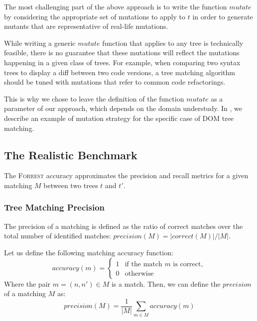 \documentclass{vldb}
\newcommand{\forrest}[0]{\textsc{Forrest}\xspace}
\begin{document}

The most challenging part of the above approach is to write the function $mutate$ by considering the appropriate set of mutations to apply to $t$ in order to generate mutants that are representative of real-life mutations.

While writing a generic $mutate$ function that applies to any tree is technically feasible, there is no guarantee that these mutations will reflect the mutations happening in a given class of trees.
For example, when comparing two syntax trees to display a diff between two code versions, a tree matching algorithm should be tuned with mutations that refer to common code refactorings.

This is why we chose to leave the definition of the function $mutate$ as a parameter of our approach, which depends on the domain understudy. 
In , we describe an example of mutation strategy for the specific case of DOM tree matching.

\subsection{The Realistic Benchmark}\label{sec:forrest_accuracy}
The \forrest accuracy approximates the precision and recall metrics for a given matching $M$ between two trees $t$ and $t'$.

\subsubsection{Tree Matching Precision}
The precision of a matching is defined as the ratio of correct matches over the total number of identified matches: $precision(M)=|correct(M)|/|M|$.

Let us define the following matching accuracy function:
\begin{equation}
accuracy(m) =
\begin{cases}
    1 &\text{if the match } m \text{ is correct},\\
    0 & \text{otherwise}
\end{cases}
\end{equation}
Where the pair $m=(n, n') \in M$ is a match.
Then, we can define the $precision$ of a matching $M$ as:
\begin{equation}
    precision(M) = \frac{1}{|M|}\sum_{m \in M}accuracy(m)
\end{equation}
\end{document}
